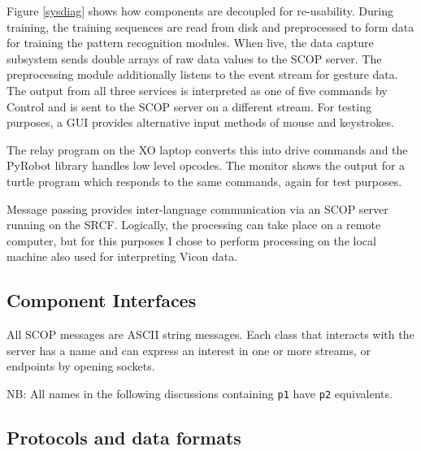 \documentclass[12pt,a4,notitlepage]{report}
\renewcommand{\_}{\texttt{\symbol{95}}}
\newcommand{\<}{\texttt{\symbol{60}}}
\renewcommand{\>}{\texttt{\symbol{62}}}
\begin{document}
Figure \ref{sysdiag} shows how components are decoupled for re-usability. During training, the training sequences are read from disk and preprocessed to form data for training the pattern recognition modules. When live, the data capture subsystem sends double arrays of raw data values to the SCOP server. The preprocessing module additionally listens to the event stream for gesture data. The output from all three services is interpreted as one of five commands by Control and is sent to the SCOP server on a different stream. For testing purposes, a GUI provides alternative input methods of mouse and keystrokes.

The relay program on the XO laptop converts this into drive commands and the PyRobot library handles low level opcodes. The monitor shows the output for a turtle program which responds to the same commands, again for test purposes.

Message passing provides inter-language communication via an SCOP server running on the SRCF. Logically, the processing can take place on a remote computer, but for this purposes I chose to perform processing on the local machine also used for interpreting Vicon data.

\subsection{Component Interfaces}

All SCOP messages are ASCII string messages. Each class that interacts with the server has a name and can express an interest in one or more streams, or endpoints by opening sockets.

NB: All names in the following discussions containing \verb^p1^ have \verb^p2^ equivalents.

\subsection{Protocols and data formats}
\end{document}

